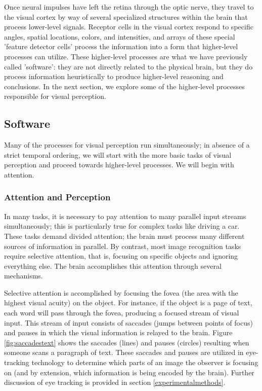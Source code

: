 \documentclass[11pt]{isuthesis}\usepackage[]{graphicx}\usepackage[]{color}
\begin{document}
Once neural impulses have left the retina through the optic nerve, they travel to the visual cortex by way of several specialized structures within the brain that process lower-level signals. Receptor cells in the visual cortex respond to specific angles, spatial locations, colors, and intensities, and arrays of these special 'feature detector cells' process the information into a form that higher-level processes can utilize. These higher-level processes are what we have previously called 'software': they are not directly related to the physical brain, but they do process information heuristically to produce higher-level reasoning and conclusions. In the next section, we explore some of the higher-level processes responsible for visual perception.

\subsection{Software}\label{Software}
Many of the processes for visual perception run simultaneously; in absence of a strict temporal ordering, we will start with the more basic tasks of visual perception and proceed towards higher-level processes. We will begin with attention.

\subsubsection{Attention and Perception} \label{AttentionPerception}
In many tasks, it is necessary to pay attention to many parallel input streams simultaneously; this is particularly true for complex tasks like driving a car. These tasks demand divided attention; the brain must process many different sources of information in parallel. By contrast, most image recognition tasks require selective attention, that is, focusing on specific objects and ignoring everything else. The brain accomplishes this attention through several mechanisms. 

Selective attention is accomplished by focusing the fovea (the area with the highest visual acuity) on the object. For instance, if the object is a page of text, each word will pass through the fovea, producing a focused stream of visual input. This stream of input consists of saccades (jumps between points of focus) and pauses in which the visual information is relayed to the brain. Figure \ref{fig:saccadestext} shows the saccades (lines) and pauses (circles) resulting when someone scans a paragraph of text. These saccades and pauses are utilized in eye-tracking technology to determine which parts of an image the observer is focusing on (and by extension, which information is being encoded by the brain). Further discussion of eye tracking is provided in section \ref{experimentalmethods}. 
\end{document}
